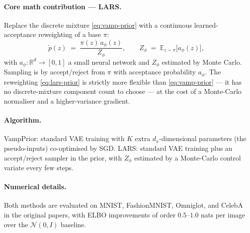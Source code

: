\documentclass[11pt,letterpaper]{article}
\newcommand{\E}{\mathbb{E}}
\newcommand{\Real}{\mathbb{R}}
\theoremstyle{plain}
\begin{document}
\paragraph{Core math contribution --- LARS.} Replace the discrete
mixture \eqref{eq:vamp-prior} with a continuous learned-acceptance
reweighting of a base $\pi$:
\begin{equation}\label{eq:lars-prior}
  \tilde p(z) \;=\; \frac{\pi(z)\,a_\phi(z)}{Z_\phi},\qquad
  Z_\phi \;=\; \E_{z\sim\pi}\!\big[a_\phi(z)\big],
\end{equation}
with $a_\phi:\Real^d\to[0,1]$ a small neural network and $Z_\phi$
estimated by Monte Carlo. Sampling is by accept/reject from $\pi$ with
acceptance probability $a_\phi$. The reweighting \eqref{eq:lars-prior}
is strictly more flexible than \eqref{eq:vamp-prior} --- it has no
discrete-mixture component count to choose --- at the cost of a
Monte-Carlo normaliser and a higher-variance gradient.

\paragraph{Algorithm.} VampPrior: standard VAE training with $K$ extra
$d_x$-dimensional parameters (the pseudo-inputs) co-optimised by SGD.
LARS: standard VAE training plus an accept/reject sampler in the prior,
with $Z_\phi$ estimated by a Monte-Carlo control variate every few
steps.

\paragraph{Numerical details.} Both methods are evaluated on MNIST,
FashionMNIST, Omniglot, and CelebA in the original papers, with ELBO
improvements of order $0.5$--$1.0$ nats per image over the
$\mathcal N(0,I)$ baseline.
\end{document}
